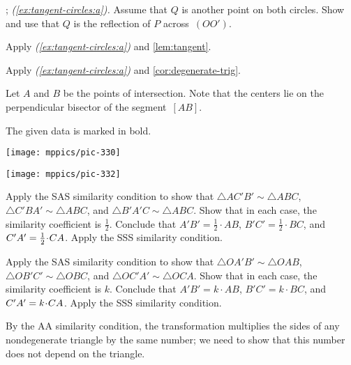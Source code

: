 \parbf{\ref{ex:tangent-circles}}; \textit{(\ref{ex:tangent-circles:a}).}
Assume that $Q$ is another point on both circles.
Show and use that $Q$ is the reflection of $P$ across~$(OO')$.

 Apply \textit{(\ref{ex:tangent-circles:a})} and \ref{lem:tangent}.

 Apply \textit{(\ref{ex:tangent-circles:a})} and \ref{cor:degenerate-trig}.

Let $A$ and $B$ be the points of intersection.
Note that the centers lie on the perpendicular bisector of the segment~$[AB]$.

The given data is marked in bold.

\begin{Figure}
\begin{minipage}{.49\textwidth}
\centering
\texttt{[image: mppics/pic-330]}
\end{minipage}
\hfill
\begin{minipage}{.49\textwidth}
\centering
\texttt{[image: mppics/pic-332]}
\end{minipage}
\end{Figure}

\setcounter{eqtn}{0}

 Apply the SAS similarity condition to show that
$\triangle AC'B'\sim\triangle ABC$, $\triangle C'BA'\sim\triangle ABC$, and $\triangle B'A'C\sim\triangle ABC$.
Show that in each case, the similarity coefficient is $\tfrac12$.
Conclude that $A'B'=\tfrac12\cdot AB$, $B'C'=\tfrac12\cdot BC$, and $C'A'\z=\tfrac12\cdot CA$.
Apply the SSS similarity condition.

 Apply the SAS similarity condition to show that
$\triangle OA'B'\sim\triangle OAB$,
$\triangle OB'C'\sim\triangle OBC$,
and $\triangle OC'A'\sim\triangle OCA$.
Show that in each case, the similarity coefficient is $k$.
Conclude that $A'B'=k\cdot AB$, $B'C'=k\cdot BC$, and $C'A'\z=k\cdot CA$.
Apply the SSS similarity condition.

By the AA similarity condition, the transformation multiplies the sides of any nondegenerate triangle by the same number; we need to show that this number does not depend on the triangle. 

